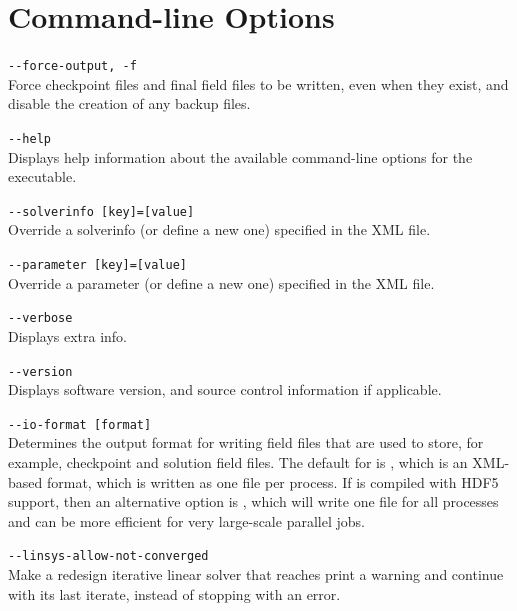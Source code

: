 \chapter{Command-line Options}
\label{command_line}
\lstinline[style=BashInputStyle]{--force-output, -f}\\
\hangindent=1.5cm
Force checkpoint files and final field files to be written, even when they exist, and disable the creation of any backup files.


\lstinline[style=BashInputStyle]{--help}\\
\hangindent=1.5cm
Displays help information about the available command-line options for the executable.

\lstinline[style=BashInputStyle]{--solverinfo [key]=[value]}\\
\hangindent=1.5cm
Override a solverinfo (or define a new one) specified in the XML file.

\lstinline[style=BashInputStyle]{--parameter [key]=[value]}\\
\hangindent=1.5cm
Override a parameter (or define a new one) specified in the XML file.

\lstinline[style=BashInputStyle]{--verbose}\\
\hangindent=1.5cm
Displays extra info.

\lstinline[style=BashInputStyle]{--version}\\
\hangindent=1.5cm
Displays software version, and source control information if applicable.


\lstinline[style=BashInputStyle]{--io-format [format]}\\
\hangindent=1.5cm Determines the output format for writing \nekpp field files
that are used to store, for example, checkpoint and solution field files. The
default for  is , which is an XML-based format, which
is written as one file per process. If \nekpp is compiled with HDF5 support,
then an alternative option is , which will write one file for all
processes and can be more efficient for very large-scale parallel jobs.

\lstinline[style=BashInputStyle]{--linsys-allow-not-converged}\\
\hangindent=1.5cm
Make a redesign iterative linear solver that reaches
 print a warning and continue with its last
iterate, instead of stopping with an error.

